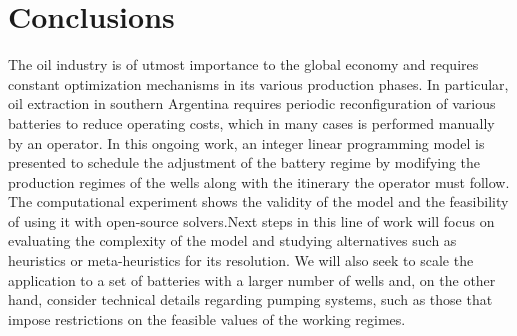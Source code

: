 \section{Conclusions} \label{sec:conclusion}

The oil industry is of utmost importance to the global economy and requires constant optimization mechanisms in its various production phases. In particular, oil extraction in southern Argentina requires periodic reconfiguration of various batteries to reduce operating costs, which in many cases is performed manually by an operator. In this ongoing work, an integer linear programming model is presented to schedule the adjustment of the battery regime by modifying the production regimes of the wells along with the itinerary the operator must follow. The computational experiment shows the validity of the model and the feasibility of using it with open-source solvers.Next steps in this line of work will focus on evaluating the complexity of the model and studying alternatives such as heuristics or meta-heuristics for its resolution. We will also seek to scale the application to a set of batteries with a larger number of wells and, on the other hand, consider technical details regarding pumping systems, such as those that impose restrictions on the feasible values of the working regimes.